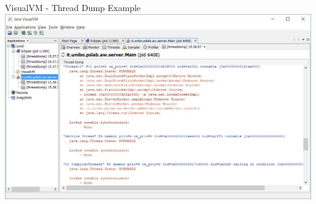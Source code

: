 \documentclass[presentation]{beamer}
\begin{document}
\begin{frame}{VisualVM - Thread Dump Example}
\centering
\includegraphics[width=0.99\textwidth]{img/jvisualvm-3}
\end{frame}
\end{document}
